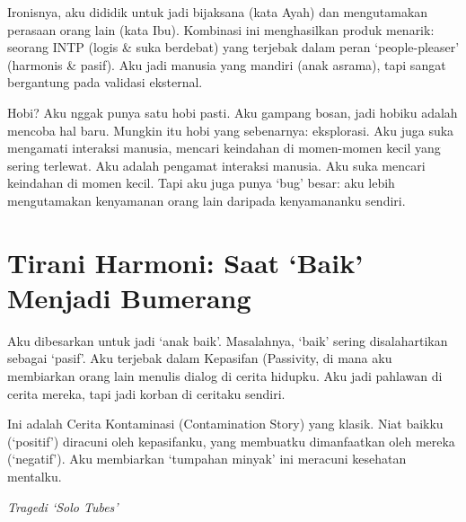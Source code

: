 \documentclass[
  letterpaper,
  DIV=11,
  numbers=noendperiod]{scrreprt}
\begin{document}
Ironisnya, aku dididik untuk jadi bijaksana (kata Ayah) dan mengutamakan
perasaan orang lain (kata Ibu). Kombinasi ini menghasilkan produk
menarik: seorang INTP (logis \& suka berdebat) yang terjebak dalam peran
`people-pleaser' (harmonis \& pasif). Aku jadi manusia yang mandiri
(anak asrama), tapi sangat bergantung pada validasi eksternal.

Hobi? Aku nggak punya satu hobi pasti. Aku gampang bosan, jadi hobiku
adalah mencoba hal baru. Mungkin itu hobi yang sebenarnya: eksplorasi.
Aku juga suka mengamati interaksi manusia, mencari keindahan di
momen-momen kecil yang sering terlewat. Aku adalah pengamat interaksi
manusia. Aku suka mencari keindahan di momen kecil. Tapi aku juga punya
`bug' besar: aku lebih mengutamakan kenyamanan orang lain daripada
kenyamananku sendiri.

\section{\texorpdfstring{\textbf{Tirani Harmoni: Saat `Baik' Menjadi
Bumerang}}{Tirani Harmoni: Saat `Baik' Menjadi Bumerang}}\label{tirani-harmoni-saat-baik-menjadi-bumerang}

Aku dibesarkan untuk jadi `anak baik'. Masalahnya, `baik' sering
disalahartikan sebagai `pasif'. Aku terjebak dalam Kepasifan (Passivity,
di mana aku membiarkan orang lain menulis dialog di cerita hidupku. Aku
jadi pahlawan di cerita mereka, tapi jadi korban di ceritaku sendiri.

Ini adalah Cerita Kontaminasi (Contamination Story) yang klasik. Niat
baikku (`positif') diracuni oleh kepasifanku, yang membuatku
dimanfaatkan oleh mereka (`negatif'). Aku membiarkan `tumpahan minyak'
ini meracuni kesehatan mentalku.

\emph{Tragedi `Solo Tubes'}
\end{document}
